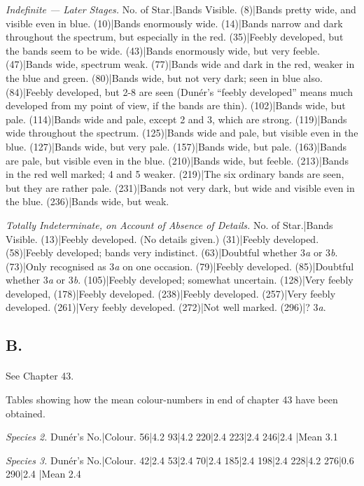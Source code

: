 \documentclass[a4paper, 12pt, oneside, polutonikogreek, english]{article}
\begin{document}
\emph{Indefinite --- Later Stages.} 
No. of Star.|Bands Visible. 
(8)|Bands pretty wide, and visible even in blue. 
(10)|Bands enormously wide. 
(14)|Bands narrow and dark throughout the spectrum, but especially in the red. 
(35)|Feebly developed, but the bands seem to be wide. 
(43)|Bands enormously wide, but very feeble. 
(47)|Bands wide, spectrum weak. 
(77)|Bands wide and dark in the red, weaker in the blue and green. 
(80)|Bands wide, but not very dark; seen in blue also. 
(84)|Feebly developed, but 2-8 are seen (Dunér's ``feebly developed'' means much developed from my point of view, if the bands are thin). 
(102)|Bands wide, but pale. 
(114)|Bands wide and pale, except 2 and 3, which are strong. 
(119)|Bands wide throughout the spectrum. 
(125)|Bands wide and pale, but visible even in the blue. 
(127)|Bands wide, but very pale. 
(157)|Bands wide, but pale. 
(163)|Bands are pale, but visible even in the blue. 
(210)|Bands wide, but feeble. 
(213)|Bands in the red well marked; 4 and 5 weaker. 
(219)|The six ordinary bands are seen, but they are rather pale. 
(231)|Bands not very dark, but wide and visible even in the blue. 
(236)|Bands wide, but weak. 

\emph{Totally Indeterminate, on Account of Absence of Details.} 
No. of Star.|Bands Visible. 
(13)|Feebly developed. (No details given.) 
(31)|Feebly developed. 
(58)|Feebly developed; bands very indistinct. 
(63)|Doubtful whether 3\emph{a} or 3\emph{b}. 
(73)|Only recognised as 3\emph{a} on one occasion. 
(79)|Feebly developed. 
(85)|Doubtful whether 3\emph{a} or 3\emph{b}. 
(105)|Feebly developed; somewhat uncertain. 
(128)|Very feebly developed, 
(178)|Feebly developed. 
(238)|Feebly developed. 
(257)|Very feebly developed. 
(261)|Very feebly developed. 
(272)|Not well marked. 
(296)|? 3\emph{a}. 
\clearpage
\subsection{B.}
\paragraph{}
See Chapter 43.

Tables showing how the mean colour-numbers in end of chapter 43 have been obtained.

\emph{Species 2.} 
Dunér's No.|Colour. 
56|4.2 
93|4.2 
220|2.4 
223|2.4 
246|2.4 
|Mean 3.1 

\emph{Species 3.} 
Dunér's No.|Colour. 
42|2.4 
53|2.4 
70|2.4 
185|2.4 
198|2.4 
228|4.2 
276|0.6 
290|2.4 
|Mean 2.4 
\end{document}
